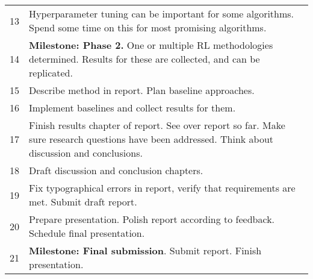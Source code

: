 \documentclass{article}
\begin{document}
\begin{table}
\begin{tabular}{r p{.80\linewidth}}
        \\
        13 &
        Hyperparameter tuning can be important for some algorithms. Spend some time on this for most promising algorithms.
        \\
        14 & \textbf{Milestone: Phase 2.} 
        One or multiple RL methodologies determined. Results for these are collected, and can be replicated.
        \\
        15 & 
        Describe method in report. Plan baseline approaches.
        \\
        16 & 
        Implement baselines and collect results for them.
        \\
        17 &
        Finish results chapter of report. See over report so far. Make sure research questions have been addressed. Think about discussion and conclusions.
        \\
        18 &
        Draft discussion and conclusion chapters.
        \\
        19 &
        Fix typographical errors in report, verify that requirements are met. Submit draft report.
        \\
        20 &
        Prepare presentation. Polish report according to feedback. Schedule final presentation.
        \\
        21 & \textbf{Milestone: Final submission}.
        Submit report. Finish presentation.
        \\
        \bottomrule
    \end{tabular}
\end{table}



\end{document}
